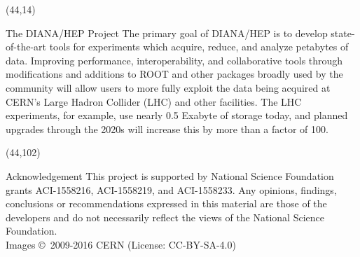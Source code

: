 \documentclass[final]{beamer}
\begin{document}
\begin{frame}{}
\begin{textblock}{38.0}(44,14)
\begin{block}{The DIANA/HEP Project}
The primary goal of DIANA/HEP is to develop state-of-the-art tools
for experiments which acquire, reduce, and analyze petabytes of
data. Improving performance, interoperability, and collaborative
tools through modifications and additions to ROOT and other packages
broadly used by the community will allow users to more fully exploit
the data being acquired at CERN's Large Hadron Collider (LHC) and
other facilities. The LHC experiments, for example, use nearly 0.5 Exabyte of
storage today, and planned upgrades through the 2020s will increase this
by more than a factor of 100. 
\end{block}
\end{textblock}













\begin{textblock}{38.0}(44,102)
\begin{block}{Acknowledgement}
This project is supported by National Science Foundation grants ACI-1558216, ACI-1558219, and ACI-1558233. Any opinions, findings, conclusions or recommendations expressed in this material are those of the developers and do not necessarily reflect the views of the National Science Foundation. \\
Images \copyright~2009-2016 CERN (License: CC-BY-SA-4.0)

\end{block}
\end{textblock}




\end{frame}
\end{document}
